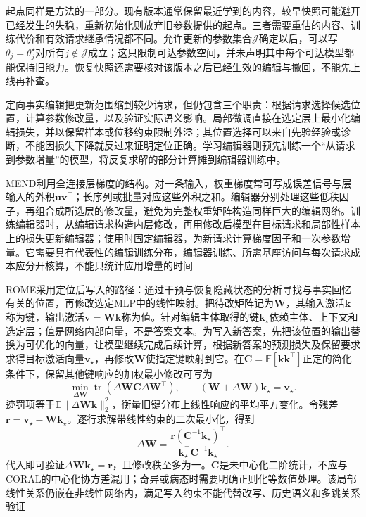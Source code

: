 起点同样是方法的一部分。现有版本通常保留最近学到的内容，较早快照可能避开已经发生的失稳，重新初始化则放弃旧参数提供的起点。三者需要重估的内容、训练代价和有效请求继承情况都不同。允许更新的参数集合$\mathcal J$确定以后，可以写$\theta_j=\theta_j^\star$对所有$j\notin\mathcal J$成立；这只限制可达参数空间，并未声明其中每个可达模型都能保持旧能力。恢复快照还需要核对该版本之后已经生效的编辑与撤回，不能先上线再补查。

定向事实编辑把更新范围缩到较少请求，但仍包含三个职责：根据请求选择候选位置，计算参数修改量，以及验证实际语义影响。局部微调直接在选定层上最小化编辑损失，并以保留样本或位移约束限制外溢；其位置选择可以来自先验经验或诊断，不能因损失下降就反过来证明定位正确。学习编辑器则预先训练一个“从请求到参数增量”的模型，将反复求解的部分计算摊到编辑器训练中。

MEND利用全连接层梯度的结构。对一条输入，权重梯度常可写成误差信号与层输入的外积$\bm u\bm v^\top$；长序列或批量对应这些外积之和。编辑器分别处理这些低秩因子，再组合成所选层的修改量，避免为完整权重矩阵构造同样巨大的编辑网络。训练编辑器时，从编辑请求构造内层修改，再用修改后模型在目标请求和局部性样本上的损失更新编辑器；使用时固定编辑器，为新请求计算梯度因子和一次参数增量。它需要具有代表性的编辑训练分布，编辑器训练、所需基座访问与每次请求成本应分开核算，不能只统计应用增量的时间

ROME采用定位后写入的路径：通过干预与恢复隐藏状态的分析寻找与事实回忆有关的位置，再修改选定MLP中的线性映射。把待改矩阵记为$\bm W$，其输入激活$\bm k$称为键，输出激活$\bm v=\bm W\bm k$称为值。针对编辑主体取得的键$\bm k_\star$依赖主体、上下文和选定层；值是网络内部向量，不是答案文本。为写入新答案，先把该位置的输出替换为可优化的向量，让模型继续完成后续计算，根据新答案的预测损失及保留要求求得目标激活向量$\bm v_\star$，再修改$\bm W$使指定键映射到它。在$\bm C=\mathbb E[\bm k\bm k^\top]$正定的简化条件下，保留其他键响应的加权最小修改可写为
\begin{equation}
\min_{\Delta\bm W}\operatorname{tr}
(\Delta\bm W\bm C\Delta\bm W^\top),
\qquad
(\bm W+\Delta\bm W)\bm k_\star=\bm v_\star.
\label{eq:ket-update-rome-problem}
\end{equation}
迹罚项等于$\mathbb E\|\Delta\bm W\bm k\|_2^2$，衡量旧键分布上线性响应的平均平方变化。令残差$\bm r=\bm v_\star-\bm W\bm k_\star$。逐行求解带线性约束的二次最小化，得到
\begin{equation}
\Delta\bm W=
\frac{\bm r(\bm C^{-1}\bm k_\star)^\top}
{\bm k_\star^\top\bm C^{-1}\bm k_\star}.
\label{eq:ket-update-rome}
\end{equation}
代入即可验证$\Delta\bm W\bm k_\star=\bm r$，且修改秩至多为一。$\bm C$是未中心化二阶统计，不应与CORAL的中心化协方差混用；奇异或病态时需要明确正则化等数值处理。该局部线性关系仍嵌在非线性网络内，满足写入约束不能代替改写、历史语义和多跳关系验证

